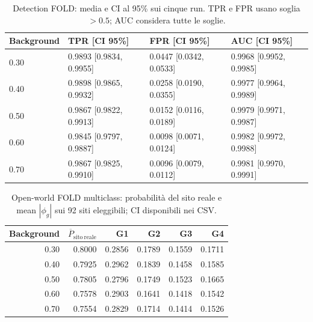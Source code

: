 \documentclass[11pt,a4paper]{article}
\begin{document}
\begin{table}[htbp]
\centering\scriptsize
\caption{Detection FOLD: media e CI al 95\% sui cinque run. TPR e FPR usano soglia $>0.5$; AUC considera tutte le soglie.}
\label{tab:crossrun-open-detection-fold}
\begin{tabular}{llll}
\toprule
Background & TPR [CI 95\%] & FPR [CI 95\%] & AUC [CI 95\%] \\
\midrule
0.30 & 0.9893 [0.9834, 0.9955] & 0.0447 [0.0342, 0.0533] & 0.9968 [0.9952, 0.9985] \\
0.40 & 0.9898 [0.9865, 0.9932] & 0.0258 [0.0190, 0.0355] & 0.9977 [0.9964, 0.9989] \\
0.50 & 0.9867 [0.9822, 0.9913] & 0.0152 [0.0116, 0.0189] & 0.9979 [0.9971, 0.9987] \\
0.60 & 0.9845 [0.9797, 0.9887] & 0.0098 [0.0071, 0.0124] & 0.9982 [0.9972, 0.9988] \\
0.70 & 0.9867 [0.9825, 0.9910] & 0.0096 [0.0079, 0.0112] & 0.9981 [0.9970, 0.9991] \\
\bottomrule
\end{tabular}
\end{table}
\clearpage
\begin{table}[htbp]
\centering\footnotesize
\caption{Open-world FOLD multiclass: probabilità del sito reale e mean $|\phi_g|$ sui 92 siti eleggibili; CI disponibili nei CSV.}
\label{tab:crossrun-open-multi-xai}
\begin{tabular}{rrrrrr}
\toprule
Background & $\overline P_{\mathrm{sito\ reale}}$ & G1 & G2 & G3 & G4 \\
\midrule
0.30 & 0.8000 & 0.2856 & 0.1789 & 0.1559 & 0.1711 \\
0.40 & 0.7925 & 0.2962 & 0.1839 & 0.1458 & 0.1585 \\
0.50 & 0.7805 & 0.2796 & 0.1749 & 0.1523 & 0.1665 \\
0.60 & 0.7578 & 0.2903 & 0.1641 & 0.1418 & 0.1542 \\
0.70 & 0.7554 & 0.2829 & 0.1714 & 0.1414 & 0.1526 \\
\bottomrule
\end{tabular}
\end{table}
\end{document}
